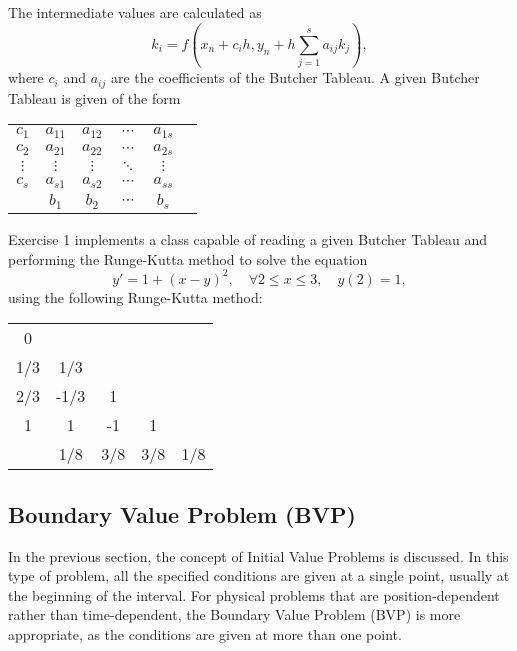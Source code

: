 The intermediate values are calculated as
\begin{equation}
    k_i = f(x_n + c_ih, y_n + h\sum_{j=1}^{s}a_{ij}k_j),
\end{equation}
where $c_i$ and $a_{ij}$ are the coefficients of the Butcher Tableau. A given Butcher Tableau is given of the form 
\begin{table}[H]
    \centering
    \begin{tabular}{c|ccccc}
        $c_1$ & $a_{11}$ & $a_{12}$ & $\cdots$ & $a_{1s}$ \\
        $c_2$ & $a_{21}$ & $a_{22}$ & $\cdots$ & $a_{2s}$ \\
        $\vdots$ & $\vdots$ & $\vdots$ & $\ddots$ & $\vdots$ \\
        $c_s$ & $a_{s1}$ & $a_{s2}$ & $\cdots$ & $a_{ss}$ \\
        \hline
        & $b_1$ & $b_2$ & $\cdots$ & $b_s$
    \end{tabular}
\end{table}

Exercise 1 implements a class capable of reading a given Butcher Tableau and performing the Runge-Kutta method to solve the equation
\begin{equation}
    y' = 1 + (x-y)^2, \quad \forall 2 \leq x \leq 3, \quad y(2) = 1,
\end{equation}
using the following Runge-Kutta method:
\begin{table}[H]
    \centering
    \begin{tabular}{c|cccc}
        0   \\
        1/3 & 1/3  \\
        2/3 & -1/3 & 1  \\
        1 & 1 & -1 & 1  \\
        \hline
        & 1/8 & 3/8 & 3/8 & 1/8
    \end{tabular}
\end{table}

\subsection{Boundary Value Problem (BVP)}\label{subsec:bvp}
In the previous section, the concept of Initial Value Problems is discussed. In this type of problem, all the specified conditions are given at a single point, usually at the beginning of the interval. For physical problems that are position-dependent rather than time-dependent, the Boundary Value Problem (BVP) is more appropriate, as the conditions are given at more than one point. 

